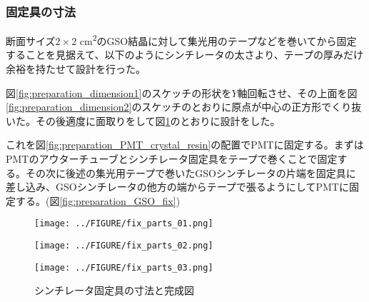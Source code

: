 \documentclass[../../main.tex]{subfiles}
\numberwithin{equation}{section}
\numberwithin{table}{section}
\numberwithin{figure}{section}
\begin{document}
\subsubsection{固定具の寸法}
  断面サイズ$2\times2$ \si{\square\centi\meter}のGSO結晶に対して集光用のテープなどを巻いてから固定することを見据えて、以下のようにシンチレータの太さより、テープの厚みだけ余裕を持たせて設計を行った。

  図\ref{fig:preparation_dimension1}のスケッチの形状を$Y$軸回転させ、その上面を図\ref{fig:preparation_dimension2}のスケッチのとおりに原点が中心の正方形でくり抜いた。その後適度に面取りをして図\ref{fig:preparation_dimension3}のとおりに設計をした。

  これを図\ref{fig:preparation_PMT_crystal_resin}の配置でPMTに固定する。まずはPMTのアウターチューブとシンチレータ固定具をテープで巻くことで固定する。その次に後述の集光用テープで巻いたGSOシンチレータの片端を固定具に差し込み、GSOシンチレータの他方の端からテープで張るようにしてPMTに固定する。(図\ref{fig:preparation_GSO_fix})
  \begin{figure}[H]
    \begin{minipage}[b]{0.48\columnwidth}
      \centering
      \texttt{[image: ../FIGURE/fix\_parts\_01.png]}
      \label{fig:preparation_dimension1}
    \end{minipage}
    \hspace{0.04\columnwidth} %
    \begin{minipage}[b]{0.48\columnwidth}
      \centering
      \texttt{[image: ../FIGURE/fix\_parts\_02.png]}
      \label{fig:preparation_dimension2}
    \end{minipage}
    \begin{minipage}[b]{0.48\columnwidth}
      \centering
      \texttt{[image: ../FIGURE/fix\_parts\_03.png]}
      \label{fig:preparation_dimension3}
    \end{minipage}
    \caption{シンチレータ固定具の寸法と完成図}
  \end{figure}
\end{document}
